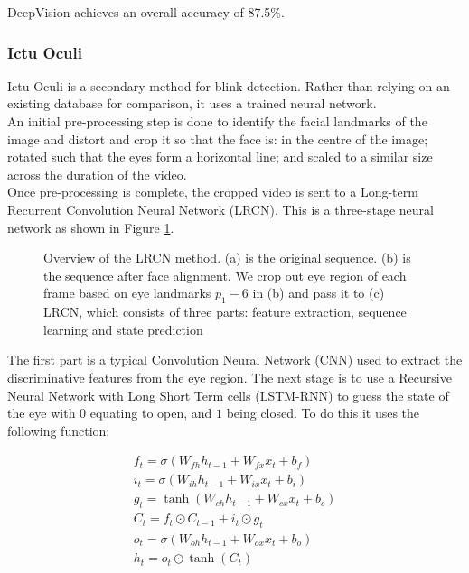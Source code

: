 \documentclass{article}
\begin{document}
DeepVision achieves an overall accuracy of 87.5\%\cite{blinking-pattern}.

\subsubsection{Ictu Oculi}

Ictu Oculi is a secondary method for blink detection. Rather than relying on an existing database for comparison, it uses a trained neural network\cite{ictuoculi}.\\

An initial pre-processing step is done to identify the facial landmarks of the image and distort and crop it so that the face is: in the centre of the image; rotated such that the eyes form a horizontal line; and scaled to a similar size across the duration of the video.\\

Once pre-processing is complete, the cropped video is sent to a Long-term Recurrent Convolution Neural Network (LRCN). This is a three-stage neural network as shown in Figure \ref{fig:LRCN}. 

\begin{figure}[H]
    \centering
    \caption{Overview of the LRCN method. (a) is the original sequence. (b) is the sequence after face alignment. We crop out eye region of each frame based on eye landmarks $p_1-6$ in (b) and pass it to (c) LRCN, which consists of three parts: feature extraction, sequence learning and state prediction\cite{ictuoculi}}
    \label{fig:LRCN}
\end{figure}

The first part is a typical Convolution Neural Network (CNN) used to extract the discriminative features from the eye region. The next stage is to use a Recursive Neural Network with Long Short Term cells (LSTM-RNN) to guess the state of the eye with $0$ equating to open, and $1$ being closed. To do this it uses the following function:

\begin{equation}
\begin{array}{l}
    f_t = \sigma \left( W_{fh} h_{t-1} + W_{fx} x_t + b _f \right) \\
    i_t = \sigma \left( W_{ih} h_{t-1} + W_{ix} x_t + b_i \right) \\
    g_t = \tanh \left( W_{ch} h_{t-1} + W_{cx} x_t + b_c \right) \\
    C_t = f_t \odot C_{t-1} + i_t \odot g_t \\
    o_t = \sigma \left( W_{oh} h_{t-1} + W_{ox} x_t + b_o \right) \\
    h_t = o_t \odot \tanh \left( C_t \right)
\end{array}
\end{equation}
\end{document}
